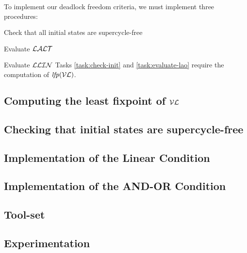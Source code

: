 To implement our deadlock freedom criteria, we must implement three procedures:
\bn
\item \label{task:check-init} Check that all initial states are supercycle-free
\item \label{task:evaluate-lao} Evaluate $\mathcal{LALT}$
\item \label{task:evaluate-llin} Evaluate $\mathcal{LLIN}$
\en
%
Tasks \ref{task:check-init} and \ref{task:evaluate-lao} require the computation of $\mathit{lfp}(\mathcal{VL})$.

\subsection{Computing the least fixpoint of $\mathcal{VL}$}
   \label{secn:computeLFP}
   


   \subsection{Checking that initial states are supercycle-free}
   \label{s:initSCFree}
   

   \subsection{Implementation of the Linear Condition}
   \label{s:implLin}
   
   
   \subsection{Implementation of the AND-OR Condition}
   \label{s:implANDOR}
   

   \subsection{Tool-set}
   \label{s:tools}
   

   \subsection{Experimentation}
   \label{s:experiments}
   

